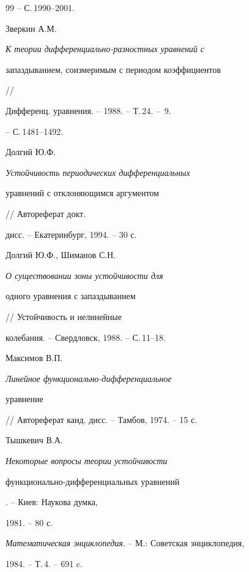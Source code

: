 \begin{thebibliography}{99}
-- С.\,1990--2001.







Зверкин А.М. {\em К теории дифференциально-разностных уравнений с


запаздыванием, соизмеримым с периодом коэффициентов} //


Дифференц. уравнения. -- 1988. -- Т.\,24. -- \No\,9.


-- С.\,1481--1492.







Долгий Ю.Ф. {\em Устойчивость периодических дифференциальных


уравнений с отклоняющимся аргументом} // Автореферат докт.


дисс. -- Екатеринбург, 1994. -- 30 с.







Долгий Ю.Ф., Шиманов С.Н. {\em О существовании зоны устойчивости для


одного уравнения с запаздыванием} // Устойчивость и нелинейные


колебания. -- Свердловск, 1988. -- С.\,11--18.







Максимов В.П. {\em Линейное функционально-дифференциальное


уравнение} // Автореферат канд. дисс. -- Тамбов, 1974. -- 15 с.







Тышкевич В.А. {\em Некоторые вопросы теории устойчивости


функционально-дифференциальных уравнений}. -- Киев: Наукова думка,


1981. -- 80 с.







{\em Математическая энциклопедия}. -- М.: Советская энциклопедия,


1984. -- Т.\,4. -- 691 c.








\end{thebibliography}
